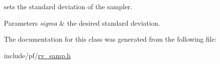 sets the standard deviation of the sampler. 


\begin{DoxyParams}{Parameters}
{\em sigma} & the desired standard deviation. \\
\hline
\end{DoxyParams}


The documentation for this class was generated from the following file\+:\begin{DoxyCompactItemize}
\item 
include/pf/\hyperlink{rv__samp_8h}{rv\+\_\+samp.\+h}\end{DoxyCompactItemize}
